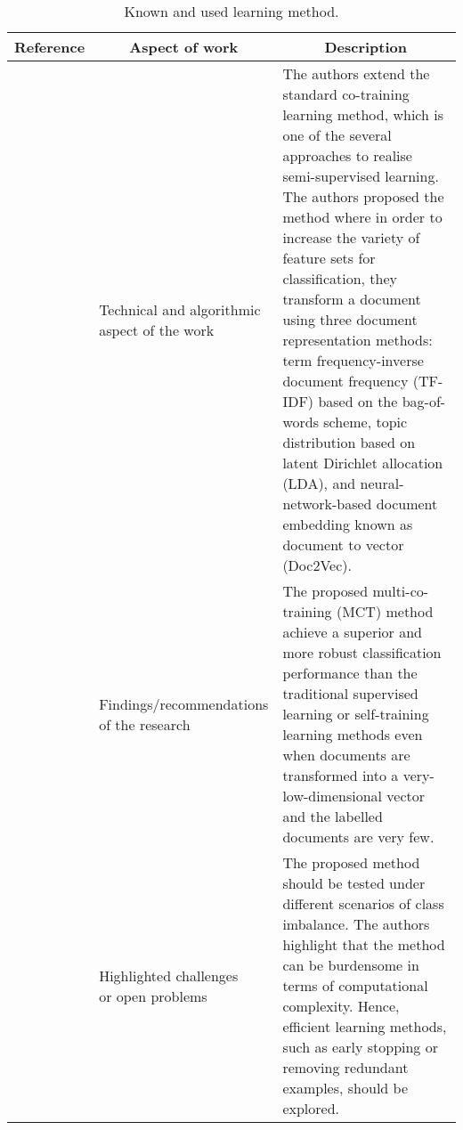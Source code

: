 \begin{landscape}
    \begin{longtable}{lp{}p{}}
    \caption{Known and used learning method.} \\
    \hline    
    Reference & \multicolumn{1}{c}{Aspect of work} & \multicolumn{1}{c}{Description} \\
	\hline
	
    \multirow{3}[10]{*}{~\citep{Kim2019}} & 
    \specialcell{Technical and algorithmic \\ aspect of the work} & 
    The authors extend the standard co-training learning method, which is one of the several approaches to realise semi-supervised learning. The authors proposed the method where in order to increase the variety of feature sets for classification, they transform a document using three document representation methods: term frequency-inverse document frequency (TF-IDF) based on the bag-of-words scheme, topic distribution based on latent Dirichlet allocation (LDA), and neural-network-based document embedding known as document to vector (Doc2Vec). 
    \\ & 
    \specialcell{Findings/recommendations \\ of the research} & 
    The proposed multi-co-training (MCT) method achieve a superior and more robust classification performance than the traditional supervised learning or self-training learning methods even when documents are transformed into a very-low-dimensional vector and the labelled documents are very few.
	\\ & 
	\specialcell{Highlighted challenges \\ or open problems} & 
	The proposed method should be tested under different scenarios of class imbalance. The authors highlight that the method can be burdensome in terms of computational complexity. Hence, efficient learning methods, such as early stopping or removing redundant examples, should be explored. 
	\\
    

\end{longtable}
\end{landscape}
